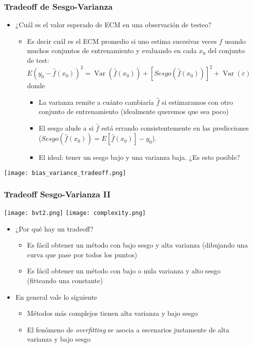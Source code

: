 \documentclass[leqno, 10pt, envcountsect]{beamer}
\numberwithin{equation}{section}
\theoremstyle{definition}
\theoremstyle{example}
\numberwithin{figure}{section}
\numberwithin{table}{section}
\let\olditem\item
\renewcommand{\item}{%
\olditem\vspace{1pt}}
\DeclareMathOperator{\var}{\mathrm{Var}}
\begin{document}
\begin{frame}[fragile=singleslide]
  \frametitle{Tradeoff de Sesgo-Varianza}
  \begin{itemize}
    \item ¿Cuál es el valor esperado de ECM en una observación de testeo?
      \begin{itemize}
        \item Es decir cuál es el ECM promedio si uno estima sucesivas veces
          $f$ usando muchos conjuntos de entrenamiento y evaluando en cada $x_{0}$
            del conjunto de test:
      \begin{equation*}
        E(y_{0} - \hat{f}(x_{0}))^{2} = \var(\hat{f}(x_{0})) +
        \left[Sesgo(\hat{f}(x_{0}))\right]^{2} + \var(\varepsilon)
      \end{equation*}
      donde
      \begin{itemize}
        \item La varianza remite a cuánto cambiaría $\hat{f}$ si estimaramos
          con otro conjunto de entrenamiento (idealmente queremos que sea
          poco)
        \item El sesgo alude a si $\hat{f}$ está errando consistentemente en
          las predicciones ($Sesgo(\hat{f}(x_{0})) = E[\hat{f}(x_{0})] -
          y_{0}$).
        \item El ideal: tener un sesgo bajo y una varianza baja. ¿Es esto
          posible?
      \end{itemize}
  \end{itemize}
  \end{itemize}
  \begin{center}
    \texttt{[image: bias\_variance\_tradeoff.png]}
  \end{center}
\end{frame}
\begin{frame}[fragile=singleslide]
  \frametitle{Tradeoff Sesgo-Varianza II}
  \begin{center}
    \texttt{[image: bvt2.png]}
    \texttt{[image: complexity.png]}
  \end{center}
  \begin{itemize}
    \item ¿Por qué hay un tradeoff?
      \begin{itemize}
        \item Es fácil obtener un método con bajo sesgo y alta varianza
          (dibujando una curva que pase por todos los puntos)
        \item Es fácil obtener un método con bajo o nula varianza y alto sesgo
          (fitteando una constante)
      \end{itemize}
    \item En general vale lo siguiente
      \begin{itemize}
        \item Métodos más complejos tienen alta varianza y bajo sesgo
        \item El fenómeno de \textit{overfitting} se asocia a escenarios
          justamente de alta varianza y bajo sesgo
      \end{itemize}
  \end{itemize}
\end{frame}
\end{document}

